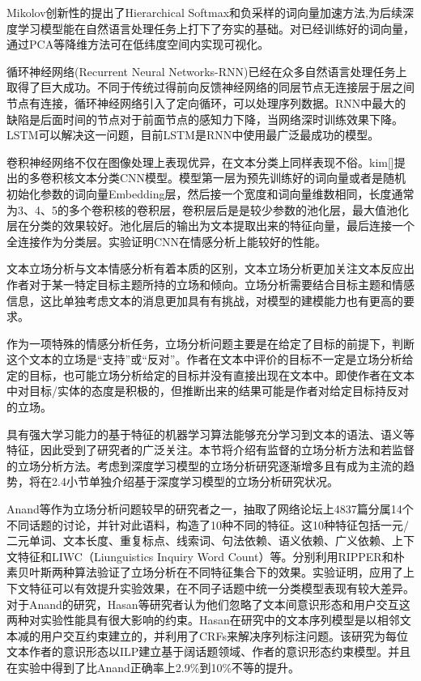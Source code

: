 Mikolov创新性的提出了Hierarchical Softmax和负采样的词向量加速方法,为后续深度学习模型能在自然语言处理任务上打下了夯实的基础。对已经训练好的词向量，通过PCA等降维方法可在低纬度空间内实现可视化。

循环神经网络(Recurrent Neural Networks-RNN)已经在众多自然语言处理任务上取得了巨大成功。不同于传统过得前向反馈神经网络的同层节点无连接层于层之间节点有连接，循环神经网络引入了定向循环，可以处理序列数据。RNN中最大的缺陷是后面时间的节点对于前面节点的感知力下降，当网络深时训练效果下降。LSTM可以解决这一问题，目前LSTM是RNN中使用最广泛最成功的模型。

卷积神经网络不仅在图像处理上表现优异，在文本分类上同样表现不俗。kim[]提出的多卷积核文本分类CNN模型。模型第一层为预先训练好的词向量或者是随机初始化参数的词向量Embedding层，然后接一个宽度和词向量维数相同，长度通常为3、4、5的多个卷积核的卷积层，卷积层后是是较少参数的池化层，最大值池化层在分类的效果较好。池化层后的输出为文本提取出来的特征向量，最后连接一个全连接作为分类层。实验证明CNN在情感分析上能较好的性能。

文本立场分析与文本情感分析有着本质的区别，文本立场分析更加关注文本反应出作者对于某一特定目标主题所持的立场和倾向。立场分析需要结合目标主题和情感信息，这比单独考虑文本的消息更加具有有挑战，对模型的建模能力也有更高的要求。

作为一项特殊的情感分析任务，立场分析问题主要是在给定了目标的前提下，判断这个文本的立场是“支持”或“反对”。作者在文本中评价的目标不一定是立场分析给定的目标，也可能立场分析给定的目标并没有直接出现在文本中。即使作者在文本中对目标/实体的态度是积极的，但推断出来的结果可能是作者对给定目标持反对的立场。

具有强大学习能力的基于特征的机器学习算法能够充分学习到文本的语法、语义等特征，因此受到了研究者的广泛关注。本节将介绍有监督的立场分析方法和若监督的立场分析方法。考虑到深度学习模型的立场分析研究逐渐增多且有成为主流的趋势，将在2.4小节单独介绍基于深度学习模型的立场分析研究状况。



Anand等作为立场分析问题较早的研究者之一，抽取了网络论坛上4837篇分属14个不同话题的讨论，并针对此语料，构造了10种不同的特征。这10种特征包括一元/二元单词、文本长度、重复标点、线索词、句法依赖、语义依赖、广义依赖、上下文特征和LIWC（Liunguistics Inquiry Word Count）等。分别利用RIPPER和朴素贝叶斯两种算法验证了立场分析在不同特征集合下的效果。实验证明，应用了上下文特征可以有效提升实验效果，在不同子话题中统一分类模型表现有较大差异。对于Anand的研究，Hasan等研究者认为他们忽略了文本间意识形态和用户交互这两种对实验性能具有很大影响的约束。Hasan在研究中的文本序列模型是以相邻文本减的用户交互约束建立的，并利用了CRFs来解决序列标注问题。该研究为每位文本作者的意识形态以ILP建立基于阔话题领域、作者的意识形态约束模型。并且在实验中得到了比Anand正确率上2.9\%到10\%不等的提升。

